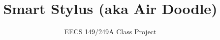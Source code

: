 \documentclass{sig-alternate-05-2015}
\begin{document}





%

\title{Smart Stylus (aka Air Doodle)}
\subtitle{EECS 149/249A Class Project}
%
%
%
%
%
\end{document}
